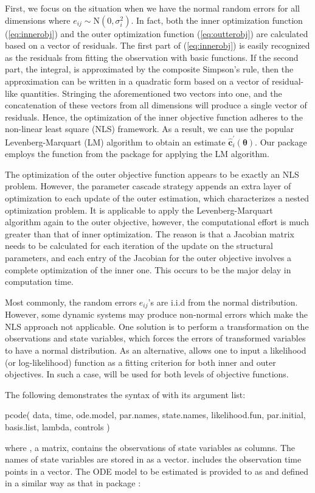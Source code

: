 First, we focus on the situation when we have the normal random errors for all dimensions where $e_{ij}\sim\text{N}(0,\sigma^{2}_{i})$. In fact, both the inner optimization function (\ref{eq:innerobj}) and the outer optimization function (\ref{eq:outterobj}) are calculated based on a vector of residuals. The first part of (\ref{eq:innerobj}) is easily recognized as the residuals from fitting the observation with basic functions. If the second part, the integral, is approximated by the composite Simpson's rule, then the approximation can be written in a quadratic form based on a vector of residual-like quantities. Stringing the aforementioned two vectors into one, and the concatenation of these vectors from all dimensions will produce a single vector of residuals. Hence, the optimization of the inner objective function adheres to the non-linear least square (NLS) framework. As a result, we can use the popular Levenberg-Marquart (LM) algorithm to obtain an estimate $\hat{\bm{c}}^{\prime}_{i}(\bm{\theta})$. Our package  employs the function  from the package  \citep{pracma} for applying the LM algorithm. 

The optimization of the outer objective function appears to be exactly an NLS problem. However, the parameter cascade strategy appends an extra layer of optimization to each update of the outer estimation, which characterizes a nested optimization problem. It is applicable to apply the Levenberg-Marquart algorithm again to the outer objective, however, the computational effort is much greater than that of inner optimization. The reason is that a Jacobian matrix needs to be calculated for each iteration of the update on the structural parameters, and each entry of the Jacobian for the outer objective involves a complete optimization of the inner one. This occurs to be the major delay in computation time. 

Most commonly, the random errors $e_{ij}$'s are i.i.d from the normal distribution. However, some dynamic systems may produce non-normal errors which make the NLS approach not applicable. One solution is to perform a transformation on the observations and state variables, which forces the errors of transformed variables to have a normal distribution. As an alternative,  allows one to input a likelihood (or log-likelihood) function as a fitting criterion for both inner and outer objectives. In such a case,  will be used for both levels of objective functions. 

The following demonstrates the syntax of  with its argument list:
\begin{example*}
pcode(
  data, time, ode.model, par.names, state.names, likelihood.fun,
  par.initial, basis.list, lambda, controls
)
\end{example*}
where , a matrix, contains the observations of state variables as columns. The names of state variables are stored in  as a vector.  includes the observation time points in a vector. The ODE model to be estimated is provided to  as  and defined in a similar way as that in package  \citep{deSolve}:

